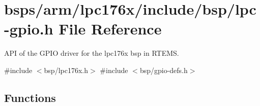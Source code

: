 \hypertarget{lpc-gpio_8h}{}\section{bsps/arm/lpc176x/include/bsp/lpc-\/gpio.h File Reference}
\label{lpc-gpio_8h}


A\+PI of the G\+P\+IO driver for the lpc176x bsp in R\+T\+E\+MS.  


{\ttfamily \#include $<$bsp/lpc176x.\+h$>$}\newline
{\ttfamily \#include $<$bsp/gpio-\/defs.\+h$>$}\newline
\subsection*{Functions}
